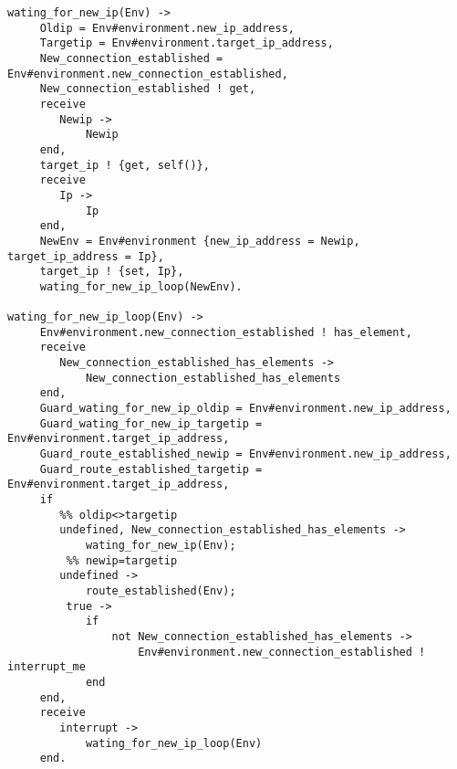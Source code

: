 \begin{verbatim}
wating_for_new_ip(Env) -> 
     Oldip = Env#environment.new_ip_address,
     Targetip = Env#environment.target_ip_address,
     New_connection_established = Env#environment.new_connection_established,
     New_connection_established ! get,
     receive 
        Newip -> 
            Newip
     end,
     target_ip ! {get, self()},
     receive 
        Ip -> 
            Ip
     end,
     NewEnv = Env#environment {new_ip_address = Newip, target_ip_address = Ip},
     target_ip ! {set, Ip},
     wating_for_new_ip_loop(NewEnv).

wating_for_new_ip_loop(Env) -> 
     Env#environment.new_connection_established ! has_element,
     receive 
        New_connection_established_has_elements -> 
            New_connection_established_has_elements
     end,
     Guard_wating_for_new_ip_oldip = Env#environment.new_ip_address,
     Guard_wating_for_new_ip_targetip = Env#environment.target_ip_address,
     Guard_route_established_newip = Env#environment.new_ip_address,
     Guard_route_established_targetip = Env#environment.target_ip_address,
     if
        %% oldip<>targetip
        undefined, New_connection_established_has_elements ->
            wating_for_new_ip(Env);
         %% newip=targetip
        undefined ->
            route_established(Env);
         true ->
            if
                not New_connection_established_has_elements ->
                    Env#environment.new_connection_established ! interrupt_me
            end
     end,
     receive 
        interrupt -> 
            wating_for_new_ip_loop(Env)
     end.
\end{verbatim}
\normalsize